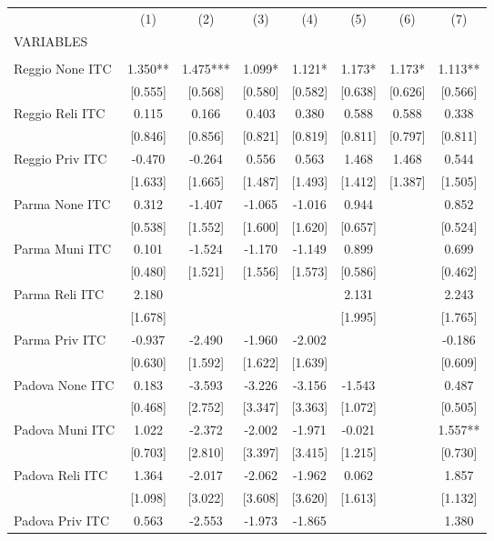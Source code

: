 \begin{tabular}{lccccccc} \hline
 & (1) & (2) & (3) & (4) & (5) & (6) & (7) \\
VARIABLES &  &  &  &  &  &  &  \\ \hline
 &  &  &  &  &  &  &  \\
Reggio None ITC & 1.350** & 1.475*** & 1.099* & 1.121* & 1.173* & 1.173* & 1.113** \\
 & [0.555] & [0.568] & [0.580] & [0.582] & [0.638] & [0.626] & [0.566] \\
Reggio Reli ITC & 0.115 & 0.166 & 0.403 & 0.380 & 0.588 & 0.588 & 0.338 \\
 & [0.846] & [0.856] & [0.821] & [0.819] & [0.811] & [0.797] & [0.811] \\
Reggio Priv ITC & -0.470 & -0.264 & 0.556 & 0.563 & 1.468 & 1.468 & 0.544 \\
 & [1.633] & [1.665] & [1.487] & [1.493] & [1.412] & [1.387] & [1.505] \\
Parma None ITC & 0.312 & -1.407 & -1.065 & -1.016 & 0.944 &  & 0.852 \\
 & [0.538] & [1.552] & [1.600] & [1.620] & [0.657] &  & [0.524] \\
Parma Muni ITC & 0.101 & -1.524 & -1.170 & -1.149 & 0.899 &  & 0.699 \\
 & [0.480] & [1.521] & [1.556] & [1.573] & [0.586] &  & [0.462] \\
Parma Reli ITC & 2.180 &  &  &  & 2.131 &  & 2.243 \\
 & [1.678] &  &  &  & [1.995] &  & [1.765] \\
Parma Priv ITC & -0.937 & -2.490 & -1.960 & -2.002 &  &  & -0.186 \\
 & [0.630] & [1.592] & [1.622] & [1.639] &  &  & [0.609] \\
Padova None ITC & 0.183 & -3.593 & -3.226 & -3.156 & -1.543 &  & 0.487 \\
 & [0.468] & [2.752] & [3.347] & [3.363] & [1.072] &  & [0.505] \\
Padova Muni ITC & 1.022 & -2.372 & -2.002 & -1.971 & -0.021 &  & 1.557** \\
 & [0.703] & [2.810] & [3.397] & [3.415] & [1.215] &  & [0.730] \\
Padova Reli ITC & 1.364 & -2.017 & -2.062 & -1.962 & 0.062 &  & 1.857 \\
 & [1.098] & [3.022] & [3.608] & [3.620] & [1.613] &  & [1.132] \\
Padova Priv ITC & 0.563 & -2.553 & -1.973 & -1.865 &  &  & 1.380 \\

\end{tabular}
